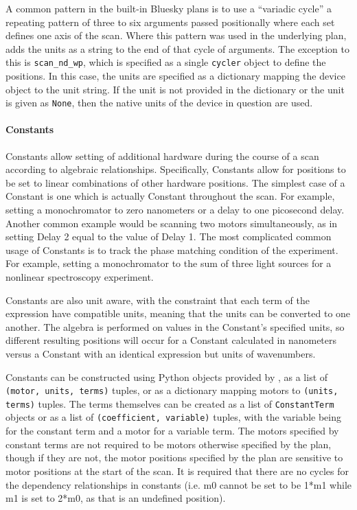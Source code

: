 A common pattern in the built-in Bluesky plans is to use a ``variadic cycle'' a repeating pattern of three to six arguments passed positionally where each set defines one axis of the scan.
Where this pattern was used in the underlying plan, \wrightplans adds the units as a string to the end of that cycle of arguments.
The exception to this is \texttt{scan\_nd\_wp}, which is specified as a single \texttt{cycler}\cite{} object to define the positions.
In this case, the units are specified as a dictionary mapping the device object to the unit string.
If the unit is not provided in the dictionary or the unit is given as \texttt{None}, then the native units of the device in question are used.

\paragraph{Constants}

Constants allow setting of additional hardware during the course of a scan according to algebraic relationships.
Specifically, Constants allow for positions to be set to linear combinations of other hardware positions.
The simplest case of a Constant is one which is actually Constant throughout the scan.
For example, setting a monochromator to zero nanometers or a delay to one picosecond delay.
Another common example would be scanning two motors simultaneously, as in setting Delay 2 equal to the value of Delay 1.
The most complicated common usage of Constants is to track the phase matching condition of the experiment.
For example, setting a monochromator to the sum of three light sources for a nonlinear spectroscopy experiment.

Constants are also unit aware, with the constraint that each term of the expression have compatible units, meaning that the units can be converted to one another.
The algebra is performed on values in the Constant's specified units, so different resulting positions will occur for a Constant calculated in nanometers versus a Constant with an identical expression but units of wavenumbers.

Constants can be constructed using Python objects provided by \wrightplans, as a list of \texttt{(motor, units, terms)} tuples, or as a dictionary mapping motors to \texttt{(units, terms)} tuples.
The terms themselves can be created as a list of \texttt{ConstantTerm} objects or as a list of \texttt{(coefficient, variable)} tuples, with the variable being  for the constant term and a motor for a variable term.
The motors specified by constant terms are not required to be motors otherwise specified by the plan, though if they are not, the motor positions specified by the plan are sensitive to motor positions at the start of the scan.
It is required that there are no cycles for the dependency relationships in constants (i.e. m0 cannot be set to be 1*m1 while m1 is set to 2*m0, as that is an undefined position).

